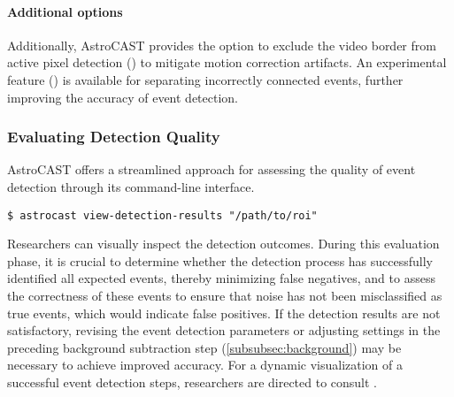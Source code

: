 \paragraph{Additional options}
Additionally, AstroCAST provides the option to exclude the video border from active pixel detection () to mitigate motion correction artifacts. An experimental feature () is available for separating incorrectly connected events, further improving the accuracy of event detection.


\subsubsection{Evaluating Detection Quality}
AstroCAST offers a streamlined approach for assessing the quality of event detection through its command-line interface.

\begin{lstlisting}[style=bashStyle]
    $ astrocast view-detection-results "/path/to/roi"
\end{lstlisting}

Researchers can visually inspect the detection outcomes. During this evaluation phase, it is crucial to determine whether the detection process has successfully identified all expected events, thereby minimizing false negatives, and to assess the correctness of these events to ensure that noise has not been misclassified as true events, which would indicate false positives. If the detection results are not satisfactory, revising the event detection parameters or adjusting settings in the preceding background subtraction step (\ref{subsubsec:background}) may be necessary to achieve improved accuracy. For a dynamic visualization of a successful event detection steps, researchers are directed to consult .
